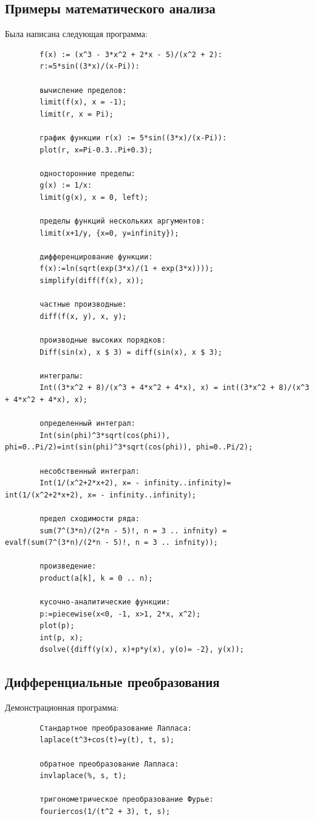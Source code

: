 \documentclass[a4paper,14pt]{extarticle}
\begin{document}
    \subsection{Примеры математического анализа}
    Была написана следующая программа:
    \begin{lstlisting}
        f(x) := (x^3 - 3*x^2 + 2*x - 5)/(x^2 + 2):
        r:=5*sin((3*x)/(x-Pi)):

        вычисление пределов:
        limit(f(x), x = -1);
        limit(r, x = Pi);

        график функции r(x) := 5*sin((3*x)/(x-Pi)):
        plot(r, x=Pi-0.3..Pi+0.3);

        односторонние пределы:
        g(x) := 1/x:
        limit(g(x), x = 0, left);

        пределы функций нескольких аргументов:
        limit(x+1/y, {x=0, y=infinity});

        дифференцирование функции:
        f(x):=ln(sqrt(exp(3*x)/(1 + exp(3*x))));
        simplify(diff(f(x), x));

        частные производные:
        diff(f(x, y), x, y);

        производные высоких порядков:
        Diff(sin(x), x $ 3) = diff(sin(x), x $ 3);

        интегралы:
        Int((3*x^2 + 8)/(x^3 + 4*x^2 + 4*x), x) = int((3*x^2 + 8)/(x^3 + 4*x^2 + 4*x), x);

        определенный интеграл:
        Int(sin(phi)^3*sqrt(cos(phi)), phi=0..Pi/2)=int(sin(phi)^3*sqrt(cos(phi)), phi=0..Pi/2);

        несобственный интеграл:
        Int(1/(x^2+2*x+2), x= - infinity..infinity)= int(1/(x^2+2*x+2), x= - infinity..infinity);

        предел сходимости ряда:
        sum(7^(3*n)/(2*n - 5)!, n = 3 .. infnity) = evalf(sum(7^(3*n)/(2*n - 5)!, n = 3 .. infnity));

        произведение:
        product(a[k], k = 0 .. n);

        кусочно-аналитические функции:
        p:=piecewise(x<0, -1, x>1, 2*x, x^2);
        plot(p);
        int(p, x);
        dsolve({diff(y(x), x)+p*y(x), y(o)= -2}, y(x));
    \end{lstlisting}

    \subsection{Дифференциальные преобразования}
    Демонстрационная программа:
    \begin{lstlisting}
        Стандартное преобразование Лапласа:
        laplace(t^3+cos(t)=y(t), t, s);

        обратное преобразование Лапласа:
        invlaplace(%, s, t);

        тригонометрическое преобразование Фурье:
        fouriercos(1/(t^2 + 3), t, s);
    \end{lstlisting}
\end{document}
